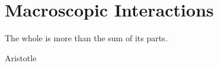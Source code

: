 \chapter{Macroscopic Interactions}
\label{lec:macro}
\epigraph{ \begin{SingleSpace}The whole is more than the sum of its parts.\end{SingleSpace} }{Aristotle}
